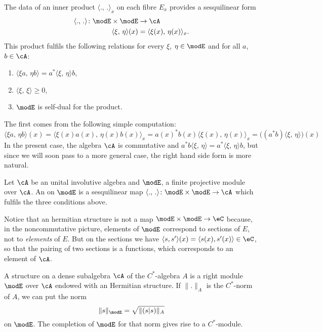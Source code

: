The data of an inner product $\langle .,\,.\rangle_x$ on each fibre $E_x$ provides a sesquilinear form
\begin{equation}
	\begin{aligned}
		\langle .,\,.\rangle\colon \modE\times\modE & \to \cA                               \\
		\langle \xi,\,\eta\rangle(x)                & =  \langle \xi(x),\,\eta(x)\rangle_x.
	\end{aligned}
\end{equation}
This product fulfils the following relations for every $\xi$, $\eta\in\modE$ and for all $a$, $b\in\cA$:
\begin{enumerate}
	\item $\langle \xi a,\,\eta b\rangle=a^*\langle \xi,\,\eta\rangle b$,
	\item $\langle \xi,\,\xi\rangle\geq 0$,
	\item $\modE$ is self-dual for the product.
\end{enumerate}
The first comes from the following simple computation:
\[
	\langle \xi a,\,\eta b\rangle(x)=\langle \xi(x) a(x),\,\eta(x)b(x)\rangle_x=a(x)^*b(x)\langle \xi(x),\,\eta(x)\rangle_x=\big((a^*b)\langle \xi,\,\eta\rangle\big)(x)
\]
In the present case, the algebra $\cA$ is commutative and $a^*b\langle \xi,\,\eta\rangle=a^*\langle \xi,\,\eta\rangle b$, but since we will soon pass to a more general case, the right hand side form is more natural.

\begin{definition}
	Let $\cA$ be an unital involutive algebra and $\modE$, a finite projective module over $\cA$. An  on $\modE$ is a sesquilinear map $ \langle .,\,.\rangle\colon \modE\times\modE\to \cA$ which fulfils the three conditions above.
\end{definition}
Notice that an hermitian structure is not a map $\modE\times\modE\to \eC$ because, in the noncommutative picture, elements of $\modE$ correspond to sections of $E$, not to \emph{elements} of $E$. But on the sections we have $\langle s, s'\rangle (x)=\langle s(x),s'(x)\rangle \in \eC$, so that the pairing of two sections is a functions, which corresponds to an element of $\cA$.

A  structure on a dense subalgebra $\cA$ of the $C^*$-algebra $A$ is a right module $\modE$ over $\cA$ endowed with an Hermitian structure. If $\| . \|_A$ is the $C^*$-norm of $A$, we can put the norm
\begin{equation}
	\| s \|_{\modE}=\sqrt{\| (s|s) \|_A}
\end{equation}
on $\modE$. The completion of $\modE$ for that norm gives rise to a $C^*$-module.

